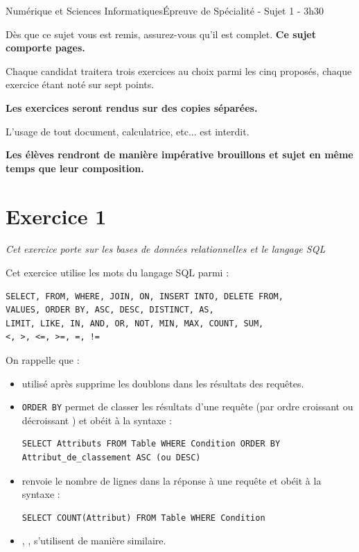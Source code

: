 \documentclass[11pt,a4paper,french,twoside]{PMCours}
\begin{document}
{Numérique et Sciences Informatiques}{Épreuve de Spécialité - Sujet 1 - 3h30}

\medskip
{\large Dès que ce sujet vous est remis, assurez-vous qu’il est complet.
\textbf{Ce sujet comporte \pageref{LastPage} pages.}

\medskip
Chaque candidat traitera trois exercices au choix parmi les cinq proposés, 
chaque exercice étant noté sur sept points.

\medskip
\textbf{Les exercices seront rendus sur des copies séparées.}

\medskip
L'usage de tout document, calculatrice, etc... est interdit.

\medskip
\textbf{Les élèves rendront de manière impérative brouillons et sujet en même temps que leur composition.}}

\newpage
\section*{Exercice 1}
\emph{Cet exercice porte sur les bases de données relationnelles et le langage SQL}

\medskip
Cet exercice utilise les mots du langage SQL parmi :
\begin{verbatim}
SELECT, FROM, WHERE, JOIN, ON, INSERT INTO, DELETE FROM, 
VALUES, ORDER BY, ASC, DESC, DISTINCT, AS,
LIMIT, LIKE, IN, AND, OR, NOT, MIN, MAX, COUNT, SUM,
<, >, <=, >=, =, !=
\end{verbatim} 

\medskip
On rappelle que :
\begin{itemize}
\item {} utilisé après  supprime les doublons dans les résultats des requêtes.
\item \verb'ORDER BY' permet de classer les résultats d'une requête (par ordre croissant  ou décroissant ) et obéit à la syntaxe : 
\begin{verbatim}
SELECT Attributs FROM Table WHERE Condition ORDER BY Attribut_de_classement ASC (ou DESC)
\end{verbatim}
\item {} renvoie le nombre de lignes dans la réponse à une requête et obéit à la syntaxe :
\begin{verbatim}
SELECT COUNT(Attribut) FROM Table WHERE Condition
\end{verbatim}
\item {}, ,  s'utilisent de manière similaire.
\end{itemize}
\end{document}
